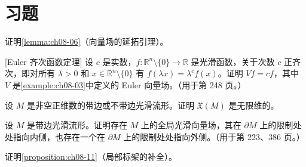 \documentclass[../../main.tex]{subfiles}
\begin{document}
\section{习题}\label{section:ch08-习题}

\begin{exercise}\label{exercise:ch08-01}
证明\cref{lemma:ch08-06}（向量场的延拓引理）。
\end{exercise}

\begin{exercise}\label{exercise:ch08-02}[Euler 齐次函数定理]
设 $c$ 是实数，$f\colon\mathbb{R}^n\setminus\{0\}\to\mathbb{R}$ 是光滑函数，关于次数 $c$ 正齐次，即对所有 $\lambda>0$ 和 $x\in\mathbb{R}^n\setminus\{0\}$ 有 $f(\lambda x)=\lambda^c f(x)$。证明 $Vf=cf$，其中 $V$ 是\cref{example:ch08-03}中定义的 Euler 向量场。（用于第 248 页。）
\end{exercise}

\begin{exercise}\label{exercise:ch08-03}
设 $M$ 是非空正维数的带边或不带边光滑流形。证明 $\mathfrak{X}(M)$ 是无限维的。
\end{exercise}

\begin{exercise}\label{exercise:ch08-04}
设 $M$ 是带边光滑流形。证明存在 $M$ 上的全局光滑向量场，其在 $\partial M$ 上的限制处处指向内侧，也存在一个在 $\partial M$ 上的限制处处指向外侧。（用于第 223、386 页。）
\end{exercise}

\begin{exercise}\label{exercise:ch08-05}
证明\cref{proposition:ch08-11}（局部标架的补全）。
\end{exercise}
\end{document}
